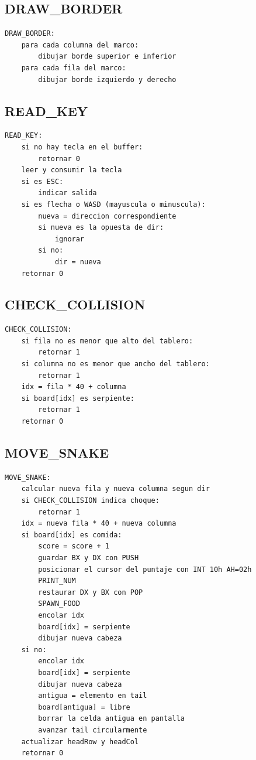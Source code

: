 \documentclass[10pt]{article}
\begin{document}
\subsection{DRAW\_BORDER}
\begin{lstlisting}[language={},caption={Pseudocódigo de DRAW\_BORDER.},label={lst:p-border}]
DRAW_BORDER:
    para cada columna del marco:
        dibujar borde superior e inferior
    para cada fila del marco:
        dibujar borde izquierdo y derecho
\end{lstlisting}

\subsection{READ\_KEY}
\begin{lstlisting}[language={},caption={Pseudocódigo de READ\_KEY.},label={lst:p-read}]
READ_KEY:
    si no hay tecla en el buffer:
        retornar 0
    leer y consumir la tecla
    si es ESC:
        indicar salida
    si es flecha o WASD (mayuscula o minuscula):
        nueva = direccion correspondiente
        si nueva es la opuesta de dir:
            ignorar
        si no:
            dir = nueva
    retornar 0
\end{lstlisting}

\subsection{CHECK\_COLLISION}
\begin{lstlisting}[language={},caption={Pseudocódigo de CHECK\_COLLISION.},label={lst:p-check}]
CHECK_COLLISION:
    si fila no es menor que alto del tablero:
        retornar 1
    si columna no es menor que ancho del tablero:
        retornar 1
    idx = fila * 40 + columna
    si board[idx] es serpiente:
        retornar 1
    retornar 0
\end{lstlisting}

\subsection{MOVE\_SNAKE}
\begin{lstlisting}[language={},caption={Pseudocódigo de MOVE\_SNAKE.},label={lst:p-move}]
MOVE_SNAKE:
    calcular nueva fila y nueva columna segun dir
    si CHECK_COLLISION indica choque:
        retornar 1
    idx = nueva fila * 40 + nueva columna
    si board[idx] es comida:
        score = score + 1
        guardar BX y DX con PUSH
        posicionar el cursor del puntaje con INT 10h AH=02h
        PRINT_NUM
        restaurar DX y BX con POP
        SPAWN_FOOD
        encolar idx
        board[idx] = serpiente
        dibujar nueva cabeza
    si no:
        encolar idx
        board[idx] = serpiente
        dibujar nueva cabeza
        antigua = elemento en tail
        board[antigua] = libre
        borrar la celda antigua en pantalla
        avanzar tail circularmente
    actualizar headRow y headCol
    retornar 0
\end{lstlisting}
\end{document}

